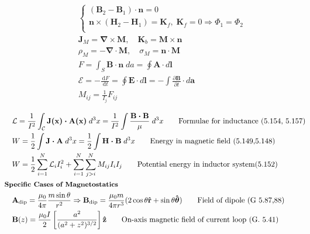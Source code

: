 \documentclass[10pt]{article}
\newcommand{\rhat}{\boldsymbol{\hat{\textbf{r}}}}
\newcommand{\zhat}{\boldsymbol{\hat{\textbf{z}}}}
\newcommand{\thetahat}{\boldsymbol{\hat{\textbf{$\theta$}}}}
\newcommand{\ve}[1]{\boldsymbol{\mathbf{#1}}}
\newcommand{\vect}[1]{\boldsymbol{\mathbf{#1}}}
\newcommand{\dd}{\, \mathrm{d}}
\newcommand{\tder}[2]{\frac{\dd #1}{\dd #2}}
\newcommand{\pder}[2]{\frac{\partial #1}{\partial #2}}
\newcommand{\lrb}[1]{\left[ #1 \right]}
\begin{document}
\begin{multicols}{2}
\begin{align*}
		&\begin{cases}
			(\vect{B}_2 - \vect{B}_1) \cdot \vect{n} = 0 \\
			\vect{n} \times (\vect{H}_2 - \vect{H}_1) = \vect{K}_f, \; \ve{K}_f = 0 \Rightarrow \Phi_1 = \Phi_2 \\
		\end{cases} \tag*{Magnetic JC's (eval. at boundary) (5.86)} \\
		& \vect{J}_M = \vect{\nabla \times M}, \quad \vect{K}_b = \vect{M \times n}  \tag*{Bound current density (G. 6.13,14)} \\
		& \rho_M = - \vect{\nabla \cdot M}, \quad \sigma_M = \vect{n \cdot M} \tag*{Effective magnetic charge density (5.96,99)} \\
		& F = \int_S \vect{B \cdot n} \; da = \oint \ve{A} \cdot d \ve{l} \tag*{Magnetic flux (5.133)} \\
		& \mathscr{E} = -\tder{F}{t} = \oint \ve{E} \cdot d\ve{l} = -\int \pder{\ve{B}}{t} \cdot d \ve{a} \tag*{EMF due to Faraday's Law (5.135)} \\
		& M_{ij} = \frac{1}{I_j} F_{ij} \tag*{Mutual inductance (5.156)} \\
	\end{align*}
	\setlength{\abovedisplayskip}{-25pt}
	\setlength{\belowdisplayskip}{0pt}
	\setlength{\abovedisplayshortskip}{0pt}
	\setlength{\belowdisplayshortskip}{0pt}
	\begin{align*} 
		& \mathcal{L} = \frac{1}{I^2} \int_\mathcal{C} \ve{J(x) \cdot A(x)} \; d^3 x = \frac{1}{I^2} \int \frac{\ve{B \cdot B}}{\mu} \; d^3 x \tag*{Formulae for inductance (5.154, 5.157)} \\
		& W = \frac{1}{2} \int \vect{J \cdot A} \; d^3 x  = \frac{1}{2} \int \vect{H \cdot B} \; d^3 x \tag*{Energy in magnetic field (5.149,5.148)} \\
		& W = \frac{1}{2} \sum_{i=1}^N \mathcal{L}_i I_i^2 + \sum_{i=1}^N \sum_{j>i}^N M_{ij} I_i I_j \tag*{Potential energy in inductor system(5.152)} \\
	& \small \hspace{-10pt} \textbf{Specific Cases of Magnetostatics} \small \\
		&\ve{A}_{\text{dip}} = \frac{\mu_0}{4 \pi} \frac{m \sin \theta}{r^2} \Rightarrow \ve{B}_{\text{dip}} = \frac{\mu_0 m}{4 \pi r^3}(2 \cos \theta \rhat + \sin \theta \thetahat) \tag*{Field of dipole (G 5.87,88)} \\
		& \ve{B}(z) = \frac{\mu_0 I}{2} \lrb{ \frac{a^2}{(a^2 + z^2)^{3/2}} }\zhat \tag*{On-axis magnetic field of current loop (G. 5.41)} \\

\end{align*}
\end{multicols}
\end{document}
